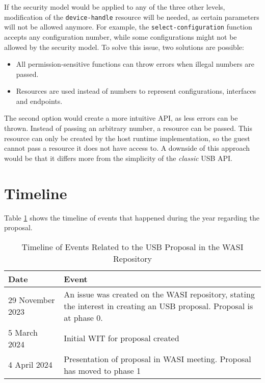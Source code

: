 If the security model would be applied to any of the three other levels, modification of the \texttt{device-handle} resource will be needed, as certain parameters will not be allowed anymore. For example, the \texttt{select-configuration} function accepts any configuration number, while some configurations might not be allowed by the security model. To solve this issue, two solutions are possible:

\begin{itemize}
\item All permission-sensitive functions can throw errors when illegal numbers are passed.
\item Resources are used instead of numbers to represent configurations, interfaces and endpoints.
\end{itemize}

The second option would create a more intuitive API, as less errors can be thrown. Instead of passing an arbitrary number, a resource can be passed. This resource can only be created by the host runtime implementation, so the guest cannot pass a resource it does not have access to. A downside of this approach would be that it differs more from the simplicity of the \textit{classic} \acrshort{USB} \acrshort{API}.

\section{Timeline}
Table \ref{tab:wasi_usb_proposal} shows the timeline of events that happened during the year regarding the proposal.

\begin{table}[h]
	\centering
	\begin{tabular}{l|p{12cm}}
		\toprule
		\textbf{Date} & \textbf{Event} \\
		\midrule
		29 November 2023 & An issue \cite{wasi_issue_570} was created on the WASI repository, stating the interest in creating an USB proposal. Proposal is at phase 0. \\
		5 March 2024 & Initial WIT for proposal created\\
		4 April 2024 & Presentation \cite{wasi_meeting_notes} of proposal in WASI meeting. Proposal has moved to phase 1 \\
		\bottomrule
	\end{tabular}
	\caption{Timeline of Events Related to the USB Proposal in the WASI Repository}
	\label{tab:wasi_usb_proposal}
\end{table}